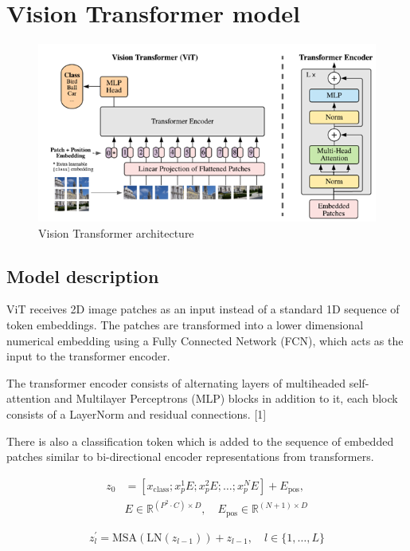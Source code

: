 \documentclass[conference]{IEEEtran}
\begin{document}
\section{Vision Transformer model}

\begin{figure}[htbp]
\centerline{\includegraphics[width=0.75\linewidth]{vit_block.png}}
\caption{Vision Transformer architecture}

\end{figure}


\subsection{Model description}
ViT receives 2D image patches as an input instead of a standard 1D sequence of token embeddings. The patches are transformed into a lower dimensional numerical embedding using a Fully Connected Network (FCN), which acts as the input to the transformer encoder.

The transformer encoder consists of alternating layers of multiheaded self-attention and Multilayer Perceptrons (MLP) blocks in addition to it, each block consists of a LayerNorm and residual connections. [1]

There is also a classification token which is added to the sequence of embedded patches similar to bi-directional encoder representations from transformers. 

\begin{align}
z_0 &= [x_{\text{class}}; x_p^{1}E; x_p^{2}E; \ldots ; x_p^{N}E] + E_{\text{pos}}, \nonumber \\
& E \in \mathbb{R}^{(P^2 \cdot C) \times D}, \quad E_{\text{pos}} \in \mathbb{R}^{(N+1) \times D}
\end{align}

\begin{equation}
z_l^{'} = \text{MSA}(\text{LN}(z_{l-1})) + z_{l-1}, \quad l \in \{1, \ldots, L\}
\end{equation} 
\end{document}
